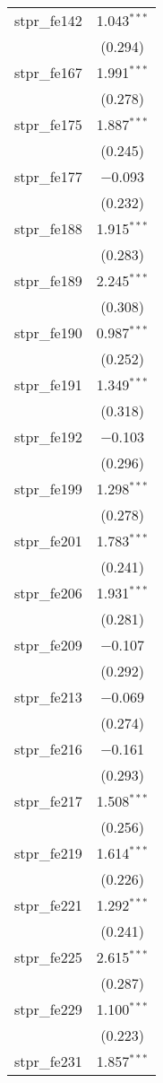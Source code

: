 \begin{table}[!htbp]
\begin{tabular}{@{\extracolsep{5pt}}lc}
  stpr\_fe142 & 1.043$^{***}$ \\ 
  & (0.294) \\ 
  stpr\_fe167 & 1.991$^{***}$ \\ 
  & (0.278) \\ 
  stpr\_fe175 & 1.887$^{***}$ \\ 
  & (0.245) \\ 
  stpr\_fe177 & $-$0.093 \\ 
  & (0.232) \\ 
  stpr\_fe188 & 1.915$^{***}$ \\ 
  & (0.283) \\ 
  stpr\_fe189 & 2.245$^{***}$ \\ 
  & (0.308) \\ 
  stpr\_fe190 & 0.987$^{***}$ \\ 
  & (0.252) \\ 
  stpr\_fe191 & 1.349$^{***}$ \\ 
  & (0.318) \\ 
  stpr\_fe192 & $-$0.103 \\ 
  & (0.296) \\ 
  stpr\_fe199 & 1.298$^{***}$ \\ 
  & (0.278) \\ 
  stpr\_fe201 & 1.783$^{***}$ \\ 
  & (0.241) \\ 
  stpr\_fe206 & 1.931$^{***}$ \\ 
  & (0.281) \\ 
  stpr\_fe209 & $-$0.107 \\ 
  & (0.292) \\ 
  stpr\_fe213 & $-$0.069 \\ 
  & (0.274) \\ 
  stpr\_fe216 & $-$0.161 \\ 
  & (0.293) \\ 
  stpr\_fe217 & 1.508$^{***}$ \\ 
  & (0.256) \\ 
  stpr\_fe219 & 1.614$^{***}$ \\ 
  & (0.226) \\ 
  stpr\_fe221 & 1.292$^{***}$ \\ 
  & (0.241) \\ 
  stpr\_fe225 & 2.615$^{***}$ \\ 
  & (0.287) \\ 
  stpr\_fe229 & 1.100$^{***}$ \\ 
  & (0.223) \\ 
  stpr\_fe231 & 1.857$^{***}$ \\ 

\end{tabular}
\end{table}
